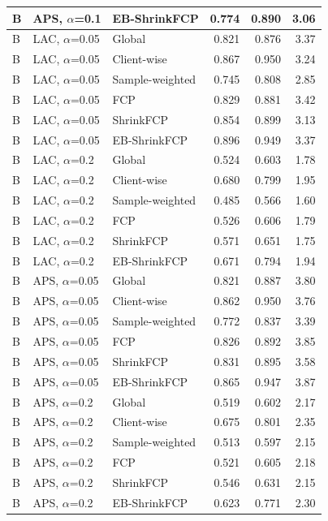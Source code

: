 \documentclass[10pt]{article}
\begin{document}
\begin{table}[!htbp]
\begin{tabular}{@{}lllrrr@{}}
B & APS, $\alpha$=0.1 & EB-ShrinkFCP & 0.774 & 0.890 & 3.06 \\
\midrule
B & LAC, $\alpha$=0.05 & Global & 0.821 & 0.876 & 3.37 \\
B & LAC, $\alpha$=0.05 & Client-wise & 0.867 & 0.950 & 3.24 \\
B & LAC, $\alpha$=0.05 & Sample-weighted & 0.745 & 0.808 & 2.85 \\
B & LAC, $\alpha$=0.05 & FCP & 0.829 & 0.881 & 3.42 \\
B & LAC, $\alpha$=0.05 & ShrinkFCP & 0.854 & 0.899 & 3.13 \\
B & LAC, $\alpha$=0.05 & EB-ShrinkFCP & 0.896 & 0.949 & 3.37 \\
\midrule
B & LAC, $\alpha$=0.2 & Global & 0.524 & 0.603 & 1.78 \\
B & LAC, $\alpha$=0.2 & Client-wise & 0.680 & 0.799 & 1.95 \\
B & LAC, $\alpha$=0.2 & Sample-weighted & 0.485 & 0.566 & 1.60 \\
B & LAC, $\alpha$=0.2 & FCP & 0.526 & 0.606 & 1.79 \\
B & LAC, $\alpha$=0.2 & ShrinkFCP & 0.571 & 0.651 & 1.75 \\
B & LAC, $\alpha$=0.2 & EB-ShrinkFCP & 0.671 & 0.794 & 1.94 \\
\midrule
B & APS, $\alpha$=0.05 & Global & 0.821 & 0.887 & 3.80 \\
B & APS, $\alpha$=0.05 & Client-wise & 0.862 & 0.950 & 3.76 \\
B & APS, $\alpha$=0.05 & Sample-weighted & 0.772 & 0.837 & 3.39 \\
B & APS, $\alpha$=0.05 & FCP & 0.826 & 0.892 & 3.85 \\
B & APS, $\alpha$=0.05 & ShrinkFCP & 0.831 & 0.895 & 3.58 \\
B & APS, $\alpha$=0.05 & EB-ShrinkFCP & 0.865 & 0.947 & 3.87 \\
\midrule
B & APS, $\alpha$=0.2 & Global & 0.519 & 0.602 & 2.17 \\
B & APS, $\alpha$=0.2 & Client-wise & 0.675 & 0.801 & 2.35 \\
B & APS, $\alpha$=0.2 & Sample-weighted & 0.513 & 0.597 & 2.15 \\
B & APS, $\alpha$=0.2 & FCP & 0.521 & 0.605 & 2.18 \\
B & APS, $\alpha$=0.2 & ShrinkFCP & 0.546 & 0.631 & 2.15 \\
B & APS, $\alpha$=0.2 & EB-ShrinkFCP & 0.623 & 0.771 & 2.30 \\
\bottomrule
\end{tabular}
\end{table}
\end{document}
